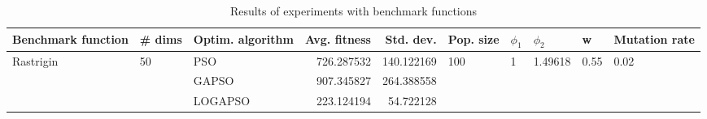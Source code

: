 \begin{table}
\centering
\caption{Results of experiments with benchmark functions}
\begin{tabular}{lllrrlllll}
\toprule
        Benchmark function &             \# dims & Optim. algorithm &  Avg. fitness &  Std. dev. &            Pop. size &         $\phi_{1}$ &               $\phi_{2}$ &                     w &         Mutation rate \\
\midrule
\multirow{3}{*}{Rastrigin} & \multirow{3}{*}{50} &              PSO &    726.287532 & 140.122169 & \multirow{3}{*}{100} & \multirow{3}{*}{1} & \multirow{3}{*}{1.49618} & \multirow{3}{*}{0.55} & \multirow{3}{*}{0.02} \\
                           &                     &            GAPSO &    907.345827 & 264.388558 &                      &                    &                          &                       &                       \\
                           &                     &          LOGAPSO &    223.124194 &  54.722128 &                      &                    &                          &                       &                       \\
\bottomrule
\end{tabular}
\end{table}
